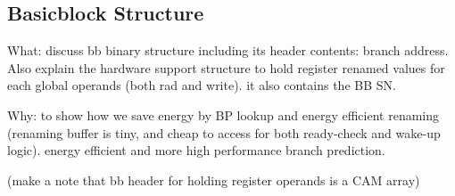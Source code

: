 \subsection{Basicblock Structure}
\label{sec:bb_struct}

What: discuss bb binary structure including its header contents: branch address.
Also explain the hardware support structure to hold register renamed values for
each global operands (both rad and write). it also contains the BB SN.

Why: to show how we save energy by BP lookup and energy efficient renaming
(renaming buffer is tiny, and cheap to access for both ready-check and wake-up
 logic). energy efficient and more high performance branch prediction.

(make a note that bb header for holding register operands is a CAM array)

% 
% 
% 
% 
